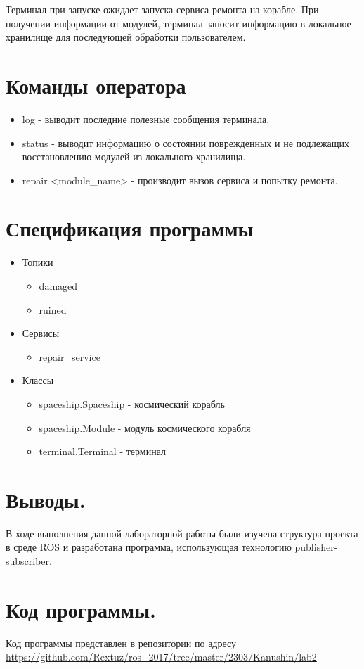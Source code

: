 \documentclass[14pt, a4paper]{extarticle}
\begin{document}
	Терминал при запуске ожидает запуска сервиса ремонта на корабле. При получении информации от модулей, терминал заносит информацию в локальное хранилище для последующей обработки пользователем.
	
	\section{Команды оператора}
	
	\begin{itemize}
		\item log - выводит последние полезные сообщения терминала.
		\item status - выводит информацию о состоянии поврежденных и не подлежащих восстановлению модулей из локального хранилища.
		\item repair <module\_name> - производит вызов сервиса и попытку ремонта.
	\end{itemize}
	
	\section{Спецификация программы}

	\begin{itemize}
		\item Топики
			\begin{itemize}
				\item damaged
				\item ruined
			\end{itemize}
		\item Сервисы
			\begin{itemize}
				\item repair\_service
			\end{itemize}
		\item Классы
			\begin{itemize}
				\item spaceship.Spaceship - космический корабль
				\item spaceship.Module - модуль космического корабля
				\item terminal.Terminal - терминал
			\end{itemize}
	\end{itemize}

	\section{Выводы.}
	В ходе выполнения данной лабораторной работы были изучена структура проекта в среде ROS и разработана программа, использующая технологию publisher-subscriber.
	
	\section{Код программы.}
	Код программы представлен в репозитории по адресу \url{https://github.com/Rextuz/ros_2017/tree/master/2303/Kanushin/lab2}
	
\end{document}
